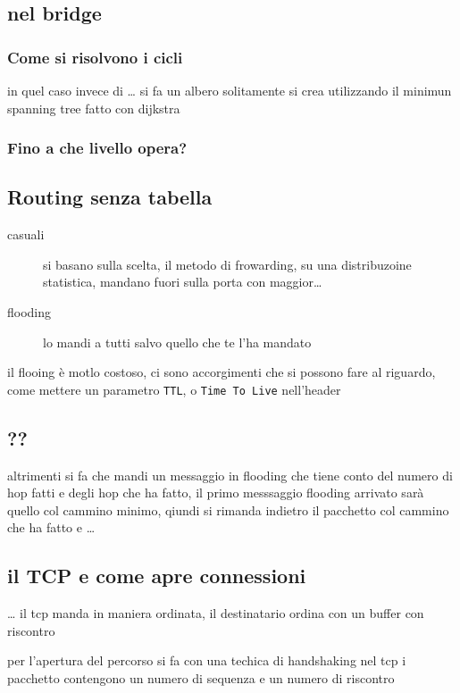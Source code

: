\documentclass[11pt]{article}
\begin{document}
\subsection{nel bridge}
\label{sec:org47921a7}
\subsubsection{Come si risolvono i cicli}
\label{sec:org354bc87}
in quel caso invece di \ldots{} si fa un albero
solitamente si crea utilizzando il minimun spanning tree fatto con dijkstra

\subsubsection{Fino a che livello opera?}
\label{sec:orgea6b948}

\subsection{Routing senza tabella}
\label{sec:org21f8f23}
\begin{description}
\item[{casuali}] si basano sulla scelta, il metodo di frowarding, su una distribuzoine statistica, mandano fuori sulla porta con maggior\ldots{}
\item[{flooding}] lo mandi a tutti salvo quello che te l'ha mandato
\end{description}

il flooing è motlo costoso, ci sono accorgimenti che si possono fare al riguardo, come mettere un parametro \texttt{TTL}, o \texttt{Time To Live} nell'header

\subsection{??}
\label{sec:org3ce8579}
altrimenti si fa che mandi un messaggio in flooding che tiene conto del numero di hop fatti e degli hop che ha fatto, il primo messsaggio flooding arrivato sarà quello col cammino minimo, qiundi si rimanda indietro il pacchetto col cammino che ha fatto e \ldots{}

\subsection{il TCP e come apre connessioni}
\label{sec:org96a2115}
\ldots{}
il tcp manda in maniera ordinata, il destinatario ordina con un buffer
con riscontro

per l'apertura del percorso si fa con una techica di handshaking
nel tcp i pacchetto contengono un numero di sequenza e un numero di riscontro
\end{document}
